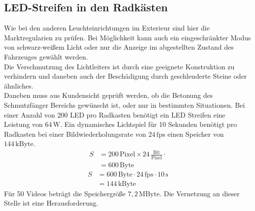 \subsection{LED-Streifen in den Radkästen}
Wie bei den anderen Leuchteinrichtungen im Exterieur sind hier die Marktregularien zu prüfen. Bei Möglichkeit kann auch ein eingeschränkter Modus von schwarz-weißem Licht oder nur die Anzeige im abgestellten Zustand des Fahrzeuges gewählt werden. \\
Die Verschmutzung des Lichtleiters ist durch eine geeignete Konstruktion zu verhindern und daneben auch der Beschädigung durch geschleuderte Steine oder ähnliches. \\
Daneben muss aus Kundensicht geprüft werden, ob die Betonung des Schmutzfänger Bereichs gewünscht ist, oder nur in bestimmten Situationen.
Bei einer Anzahl von 200 LED pro Radkasten benötigt ein LED Streifen eine Leistung von $ 64\,\mathrm{W} $.
Ein dynamisches Lichtspiel für 10 Sekunden benötigt pro Radkasten bei einer Bildwiederholungsrate von $ 24\,\mathrm{fps} $ einen Speicher von $ 144\,\mathrm{kByte}$. \\
\begin{align}
	S &= 200\,\mathrm{Pixel} \times 24\,\frac{\mathrm{Bit}}{\mathrm{Pixel}} \cdot \\
	&= 600\,\mathrm{Byte}
\end{align}
\begin{align}
	S &= 600\,\mathrm{Byte} \cdot 24\,\mathrm{fps} \cdot 10\,\mathrm{s}\\
	&= 144\,\mathrm{kByte}
\end{align}
Für 50 Videos beträgt die Speichergröße $ 7,2\,\mathrm{MByte} $.
Die Vernetzung an dieser Stelle ist eine Herausforderung.

